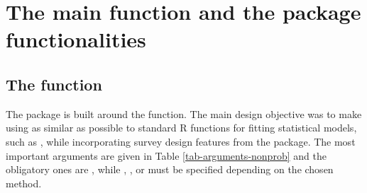 \documentclass[
]{jss}
\begin{document}
\section{The main function and the package
functionalities}\label{sec-package}

\subsection[The nonprob function]{The  function}

The  package is built around the 
function. The main design objective was to make using  as
similar as possible to standard R functions for fitting statistical
models, such as , while incorporating survey design
features from the  package. The most important arguments are
given in Table \ref{tab-arguments-nonprob} and the obligatory ones are
, while , , or 
must be specified depending on the chosen method.
\end{document}
